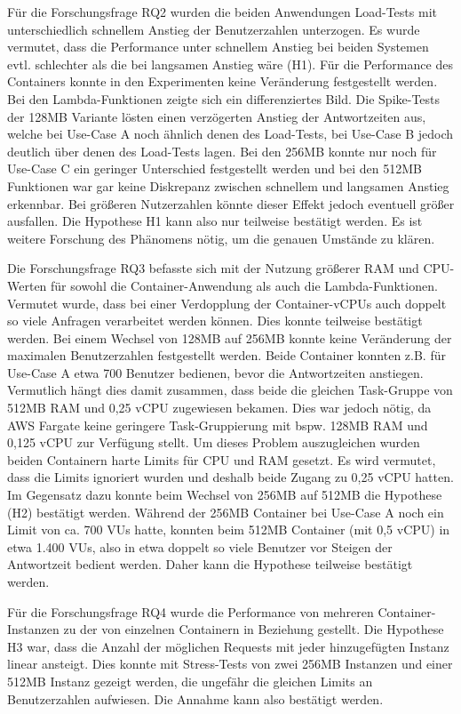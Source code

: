 Für die Forschungsfrage RQ2 wurden die beiden Anwendungen Load-Tests mit unterschiedlich schnellem Anstieg der Benutzerzahlen unterzogen. Es wurde vermutet, dass die Performance unter schnellem Anstieg bei beiden Systemen evtl. schlechter als die bei langsamen Anstieg wäre (H1). Für die Performance des Containers konnte in den Experimenten keine Veränderung festgestellt werden. Bei den Lambda-Funktionen zeigte sich ein differenziertes Bild. Die Spike-Tests der 128MB Variante lösten einen verzögerten Anstieg der Antwortzeiten aus, welche bei Use-Case A noch ähnlich denen des Load-Tests, bei Use-Case B jedoch deutlich über denen des Load-Tests lagen. Bei den 256MB konnte nur noch für Use-Case C ein geringer Unterschied festgestellt werden und bei den 512MB Funktionen war gar keine Diskrepanz zwischen schnellem und langsamen Anstieg erkennbar. Bei größeren Nutzerzahlen könnte dieser Effekt jedoch eventuell größer ausfallen. Die Hypothese H1 kann also nur teilweise bestätigt werden. Es ist weitere Forschung des Phänomens nötig, um die genauen Umstände zu klären.

Die Forschungsfrage RQ3 befasste sich mit der Nutzung größerer RAM und CPU-Werten für sowohl die Container-Anwendung als auch die Lambda-Funktionen. Vermutet wurde, dass bei einer Verdopplung der Container-vCPUs auch doppelt so viele Anfragen verarbeitet werden können. Dies konnte teilweise bestätigt werden. Bei einem Wechsel von 128MB auf 256MB konnte keine Veränderung der maximalen Benutzerzahlen festgestellt werden. Beide Container konnten z.B. für Use-Case A etwa 700 Benutzer bedienen, bevor die Antwortzeiten anstiegen. Vermutlich hängt dies damit zusammen, dass beide die gleichen Task-Gruppe von 512MB RAM und 0,25 vCPU zugewiesen bekamen. Dies war jedoch nötig, da AWS Fargate keine geringere Task-Gruppierung mit bspw. 128MB RAM und 0,125 vCPU zur Verfügung stellt. Um dieses Problem auszugleichen wurden beiden Containern harte Limits für CPU und RAM gesetzt. Es wird vermutet, dass die Limits ignoriert wurden und deshalb beide Zugang zu 0,25 vCPU hatten. 
Im Gegensatz dazu konnte beim Wechsel von 256MB auf 512MB die Hypothese (H2) bestätigt werden. Während der 256MB Container bei Use-Case A noch ein Limit von ca. 700 VUs hatte, konnten beim 512MB Container (mit 0,5 vCPU) in etwa 1.400 VUs, also in etwa doppelt so viele Benutzer vor Steigen der Antwortzeit bedient werden. Daher kann die Hypothese teilweise bestätigt werden.

Für die Forschungsfrage RQ4 wurde die Performance von mehreren Container-Instanzen zu der von einzelnen Containern in Beziehung gestellt. Die Hypothese H3 war, dass die Anzahl der möglichen Requests mit jeder hinzugefügten Instanz linear ansteigt. Dies konnte mit Stress-Tests von zwei 256MB Instanzen und einer 512MB Instanz gezeigt werden, die ungefähr die gleichen Limits an Benutzerzahlen aufwiesen. Die Annahme kann also bestätigt werden.

